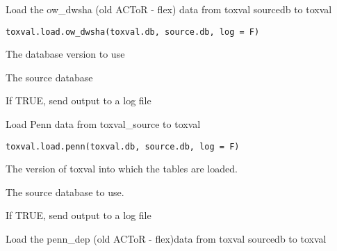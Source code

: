 \documentclass[letterpaper]{book}
\begin{document}
%
\begin{Description}\relax
Load the ow\_dwsha (old ACToR - flex) data  from toxval sourcedb to toxval
\end{Description}
%
\begin{Usage}
\begin{verbatim}
toxval.load.ow_dwsha(toxval.db, source.db, log = F)
\end{verbatim}
\end{Usage}
%
\begin{Arguments}
\begin{ldescription}
\item[\code{toxval.db}] The database version to use

\item[\code{source.db}] The source database

\item[\code{log}] If TRUE, send output to a log file
\end{ldescription}
\end{Arguments}
%
\begin{Description}\relax
Load Penn data from toxval\_source to toxval
\end{Description}
%
\begin{Usage}
\begin{verbatim}
toxval.load.penn(toxval.db, source.db, log = F)
\end{verbatim}
\end{Usage}
%
\begin{Arguments}
\begin{ldescription}
\item[\code{toxval.db}] The version of toxval into which the tables are loaded.

\item[\code{source.db}] The source database to use.

\item[\code{log}] If TRUE, send output to a log file
\end{ldescription}
\end{Arguments}
%
\begin{Description}\relax
Load the penn\_dep (old ACToR - flex)data  from toxval sourcedb to toxval
\end{Description}
\end{document}
